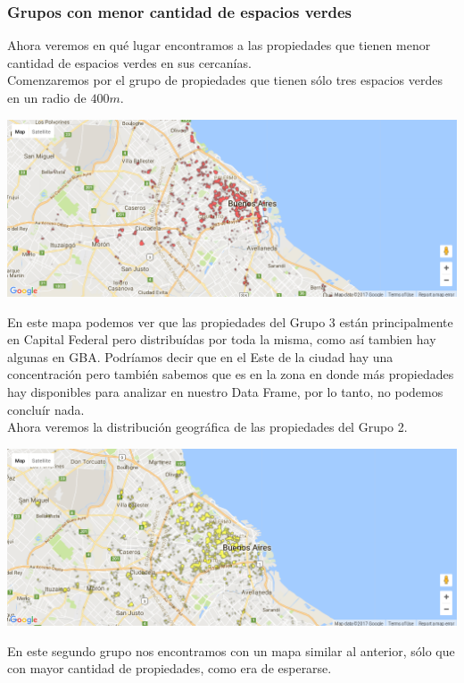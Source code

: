 \documentclass[a4paper, 10pt]{article}
\newcommand\tab[1][0.5cm]{\hspace*{#1}}
\begin{document}
			\subsubsection{Grupos con menor cantidad de espacios verdes}
				Ahora veremos en qué lugar encontramos a las propiedades que tienen menor cantidad de espacios verdes en sus
				cercanías. \\
				\tab Comenzaremos por el grupo de propiedades que tienen sólo tres espacios verdes en un radio de $400m$.
				\begin{center}
					\includegraphics[width=\textwidth]{images/parksGroup3}
				\end{center}
				\tab En este mapa podemos ver que las propiedades del Grupo 3 están principalmente en Capital Federal pero
				distribuídas por toda la misma, como así tambien hay algunas en GBA. Podríamos decir que en el Este de la ciudad
				hay una concentración pero también sabemos que es en la zona en donde más propiedades hay disponibles para analizar
				en nuestro Data Frame, por lo tanto, no podemos concluír nada. \\
				\tab Ahora veremos la distribución geográfica de las propiedades del Grupo 2.
				\begin{center}
					\includegraphics[width=\textwidth]{images/parksGroup2}
				\end{center}
				\tab En este segundo grupo nos encontramos con un mapa similar al anterior, sólo que con mayor cantidad de
				propiedades, como era de esperarse. \\
\end{document}
